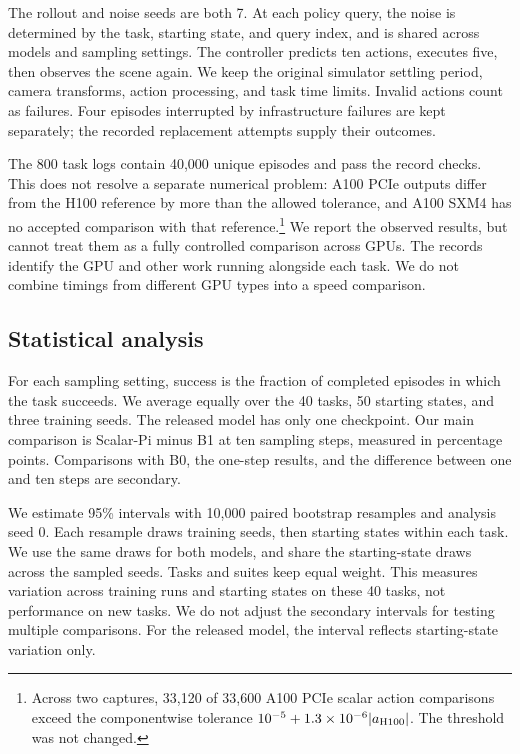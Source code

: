 \documentclass[10pt]{article}
\begin{document}
The rollout and noise seeds are both 7. At each policy query, the noise is determined by the task, starting state, and query index, and is shared across models and sampling settings. The controller predicts ten actions, executes five, then observes the scene again. We keep the original simulator settling period, camera transforms, action processing, and task time limits. Invalid actions count as failures. Four episodes interrupted by infrastructure failures are kept separately; the recorded replacement attempts supply their outcomes.

The 800 task logs contain 40,000 unique episodes and pass the record checks. This does not resolve a separate numerical problem: A100 PCIe outputs differ from the H100 reference by more than the allowed tolerance, and A100 SXM4 has no accepted comparison with that reference.\footnote{Across two captures, 33,120 of 33,600 A100 PCIe scalar action comparisons exceed the componentwise tolerance $10^{-5}+1.3\times10^{-6}|a_{\rm H100}|$. The threshold was not changed.} We report the observed results, but cannot treat them as a fully controlled comparison across GPUs. The records identify the GPU and other work running alongside each task. We do not combine timings from different GPU types into a speed comparison.

\subsection{Statistical analysis}
For each sampling setting, success is the fraction of completed episodes in which the task succeeds. We average equally over the 40 tasks, 50 starting states, and three training seeds. The released model has only one checkpoint. Our main comparison is Scalar-Pi minus B1 at ten sampling steps, measured in percentage points. Comparisons with B0, the one-step results, and the difference between one and ten steps are secondary.

We estimate 95\% intervals with 10,000 paired bootstrap resamples and analysis seed 0. Each resample draws training seeds, then starting states within each task. We use the same draws for both models, and share the starting-state draws across the sampled seeds. Tasks and suites keep equal weight. This measures variation across training runs and starting states on these 40 tasks, not performance on new tasks. We do not adjust the secondary intervals for testing multiple comparisons. For the released model, the interval reflects starting-state variation only.
\end{document}
